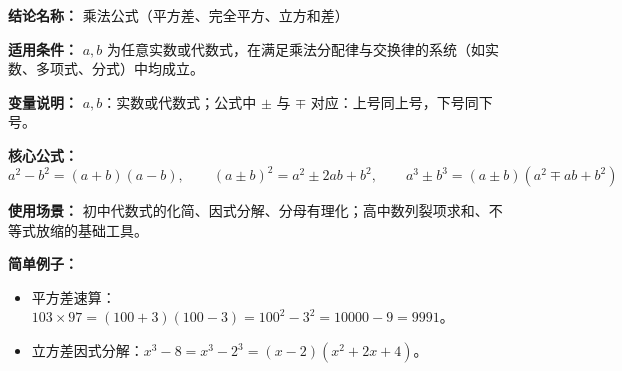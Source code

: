 \textbf{结论名称：} 乘法公式（平方差、完全平方、立方和差）

\textbf{适用条件：} \(a,b\) 为任意实数或代数式，在满足乘法分配律与交换律的系统（如实数、多项式、分式）中均成立。

\textbf{变量说明：} \(a,b\)：实数或代数式；公式中 \(\pm\) 与 \(\mp\) 对应：上号同上号，下号同下号。

\textbf{核心公式：}
\[
\boxed{a^2 - b^2 = (a+b)(a-b),\qquad (a\pm b)^2 = a^2 \pm 2ab + b^2,\qquad a^3 \pm b^3 = (a\pm b)(a^2 \mp ab + b^2)}
\]

\textbf{使用场景：} 初中代数式的化简、因式分解、分母有理化；高中数列裂项求和、不等式放缩的基础工具。

\textbf{简单例子：}
\begin{itemize}
  \item 平方差速算：\(103\times 97 = (100+3)(100-3)=100^2-3^2=10000-9=9991\)。
  \item 立方差因式分解：\(x^3-8 = x^3-2^3 = (x-2)(x^2+2x+4)\)。
\end{itemize}